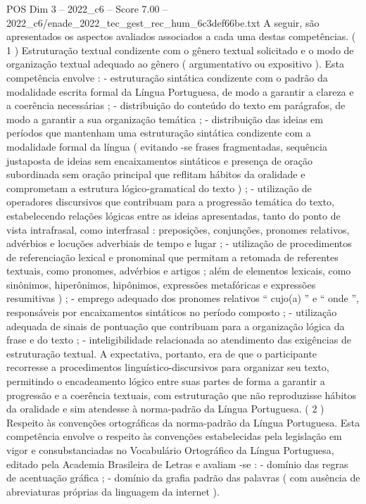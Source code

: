 \begin{textsample}{POS Dim 3 – 2022\_c6 – Score 7.00 – 2022\_c6/enade\_2022\_tec\_gest\_rec\_hum\_6c3def66be.txt}
A seguir, são apresentados os aspectos avaliados associados a cada uma destas competências. ( 1 ) Estruturação textual condizente com o gênero textual solicitado e o modo de organização textual adequado ao gênero ( argumentativo ou expositivo ).
Esta competência envolve : - estruturação sintática condizente com o padrão da modalidade escrita formal da Língua Portuguesa, de modo a garantir a clareza e a coerência necessárias ; - distribuição do conteúdo do texto em parágrafos, de modo a garantir a sua organização temática ; - distribuição das ideias em períodos que mantenham uma estruturação sintática condizente com a modalidade formal da língua ( evitando -se frases fragmentadas, sequência justaposta de ideias sem encaixamentos sintáticos e presença de oração subordinada sem oração principal que reflitam hábitos da oralidade e comprometam a estrutura lógico-gramatical do texto ) ; - utilização de operadores discursivos que contribuam para a progressão temática do texto, estabelecendo relações lógicas entre as ideias apresentadas, tanto do ponto de vista intrafrasal, como interfrasal : preposições, conjunções, pronomes relativos, advérbios e locuções adverbiais de tempo e lugar ; - utilização de procedimentos de referenciação lexical e pronominal que permitam a retomada de referentes textuais, como pronomes, advérbios e artigos ; além de elementos lexicais, como sinônimos, hiperônimos, hipônimos, expressões metafóricas e expressões resumitivas ) ; - emprego adequado dos pronomes relativos “ cujo(a) ” e “ onde ”, responsáveis por encaixamentos sintáticos no período composto ; - utilização adequada de sinais de pontuação que contribuam para a organização lógica da frase e do texto ; - inteligibilidade relacionada ao atendimento das exigências de estruturação textual.
A expectativa, portanto, era de que o participante recorresse a procedimentos linguístico-discursivos para organizar seu texto, permitindo o encadeamento lógico entre suas partes de forma a garantir a progressão e a coerência textuais, com estruturação que não reproduzisse hábitos da oralidade e sim atendesse à norma-padrão da Língua Portuguesa. ( 2 ) Respeito às convenções ortográficas da norma-padrão da Língua Portuguesa.
Esta competência envolve o respeito às convenções estabelecidas pela legislação em vigor e consubstanciadas no Vocabulário Ortográfico da Língua Portuguesa, editado pela Academia Brasileira de Letras e avaliam -se : - domínio das regras de acentuação gráfica ; - domínio da grafia padrão das palavras ( com ausência de abreviaturas próprias da linguagem da internet ).

\end{textsample}

